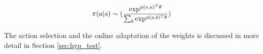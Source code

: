 \[
\pi(a|s) \sim (\frac{\exp^{\phi(s,a)^T\theta}}{ \sum_b\exp^{\phi(s,b)^T\theta}})\\
\]

The action selection and the online adaptation of the weights is discussed in more detail in Section \ref{sec:hyp_test}.


% 
% 
